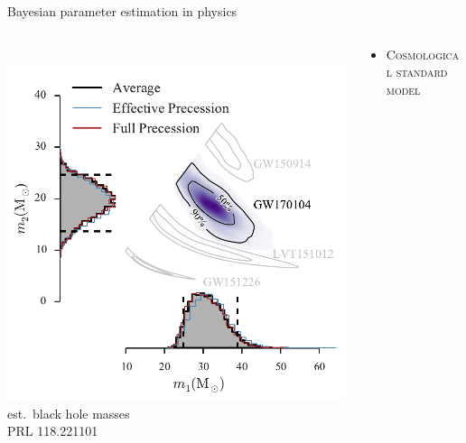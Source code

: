 \documentclass{beamer}
\begin{document}
\begin{frame}{Bayesian parameter estimation in physics}
  \begin{columns}
    \begin{column}{0.4\textwidth}
      \\
      \includegraphics[width=\columnwidth]{ligo} \\
      est.\ black hole masses\\
      {\scriptsize PRL 118.221101}\\
    \end{column}
    \begin{column}{0.6\textwidth}
      \begin{itemize}
        \item {\scshape Cosmological standard model}
      \end{itemize}
    \end{column}
  \end{columns}

\end{frame}
\end{document}
